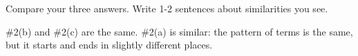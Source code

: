\documentclass{article}
\begin{document}
\begin{enumerate}
\begin{enumerate}





\end{enumerate}

    \begin{problem}[\vfill\newpage]
      Compare your three answers. Write 1-2 sentences about
      similarities you see.

    \end{problem}

    \begin{solution}
      {{{{\#2}}(b)}} and
      {{{{\#2}}(c)}} are the same.
      {{{{\#2}}(a)}} is similar: the pattern of
      terms is the same, but it starts and ends in slightly different
      places. 


\end{solution}
\end{enumerate}
\end{document}
